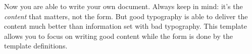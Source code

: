 Now you are able to write your own document. Always keep in mind: it's
the \emph{content} that matters, not the form. But good typography is
able to deliver the content much better than information set with bad
typography. This template allows you to focus on writing good content
while the form is done by the template definitions.


